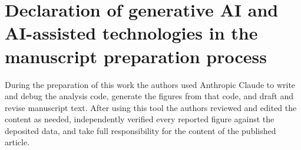 \documentclass[preprint,12pt]{elsarticle}
\begin{document}
\section*{Declaration of generative AI and AI-assisted technologies in the
manuscript preparation process}
During the preparation of this work the authors used Anthropic Claude to write
and debug the analysis code, generate the figures from that code, and draft and
revise manuscript text. After using this tool the authors reviewed and edited
the content as needed, independently verified every reported figure against the
deposited data, and take full responsibility for the content of the published
article.



\end{document}
